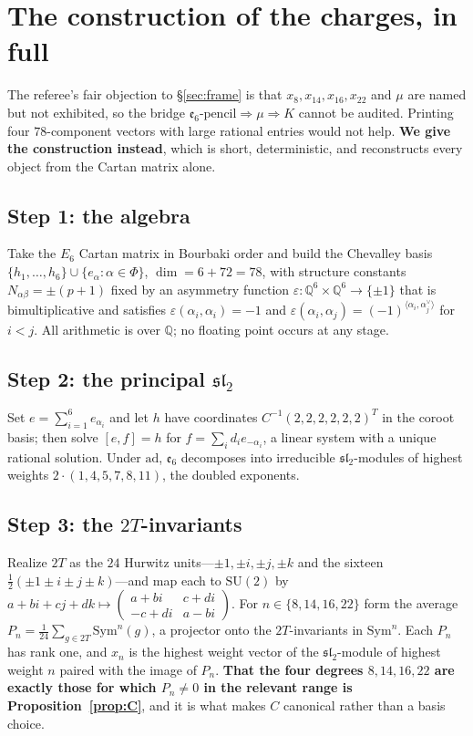 \documentclass[11pt,reqno]{amsart}
\theoremstyle{plain}
\theoremstyle{definition}
\theoremstyle{remark}
\newcommand{\Q}{\mathbb{Q}}
\newcommand{\SU}{\mathrm{SU}}
\newcommand{\sll}{\mathfrak{sl}}
\newcommand{\ee}{\mathfrak{e}}
\begin{document}
\appendix

\section{The construction of the charges, in full}\label{app:construct}

The referee's fair objection to \S\ref{sec:frame} is that $x_8,x_{14},x_{16},x_{22}$
and $\mu$ are named but not exhibited, so the bridge
$\ee_6\text{-pencil}\Rightarrow\mu\Rightarrow K$ cannot be audited. Printing four
$78$-component vectors with large rational entries would not help. \textbf{We give the
construction instead}, which is short, deterministic, and reconstructs every object
from the Cartan matrix alone.

\subsection*{Step 1: the algebra}
Take the $E_6$ Cartan matrix in Bourbaki order and build the Chevalley basis
$\{h_1,\dots,h_6\}\cup\{e_\alpha:\alpha\in\Phi\}$, $\dim=6+72=78$, with structure
constants $N_{\alpha\beta}=\pm(p+1)$ fixed by an asymmetry function
$\varepsilon:\Q^6\times\Q^6\to\{\pm1\}$ that is bimultiplicative and satisfies
$\varepsilon(\alpha_i,\alpha_i)=-1$ and
$\varepsilon(\alpha_i,\alpha_j)=(-1)^{\langle\alpha_i,\alpha_j^\vee\rangle}$ for $i<j$.
All arithmetic is over $\Q$; no floating point occurs at any stage.

\subsection*{Step 2: the principal $\sll_2$}
Set $e=\sum_{i=1}^{6}e_{\alpha_i}$ and let $h$ have coordinates $C^{-1}(2,2,2,2,2,2)^{T}$
in the coroot basis; then solve $[e,f]=h$ for $f=\sum_i d_i e_{-\alpha_i}$, a linear
system with a unique rational solution. Under $\mathrm{ad}$, $\ee_6$ decomposes into
irreducible $\sll_2$-modules of highest weights $2\cdot(1,4,5,7,8,11)$, the doubled
exponents.

\subsection*{Step 3: the $2T$-invariants}
Realize $2T$ as the $24$ Hurwitz units---$\pm1,\pm i,\pm j,\pm k$ and the sixteen
$\tfrac12(\pm1\pm i\pm j\pm k)$---and map each to $\SU(2)$ by
$a+bi+cj+dk\mapsto\left(\begin{smallmatrix}a+bi&c+di\\-c+di&a-bi\end{smallmatrix}\right)$.
For $n\in\{8,14,16,22\}$ form the average
$P_n=\frac{1}{24}\sum_{g\in2T}\mathrm{Sym}^n(g)$, a projector onto the
$2T$-invariants in $\mathrm{Sym}^n$. Each $P_n$ has rank one, and $x_n$ is the highest
weight vector of the $\sll_2$-module of highest weight $n$ paired with the image of
$P_n$. \textbf{That the four degrees $8,14,16,22$ are exactly those for which $P_n\neq0$
in the relevant range is Proposition~\ref{prop:C}}, and it is what makes $C$ canonical
rather than a basis choice.
\end{document}
